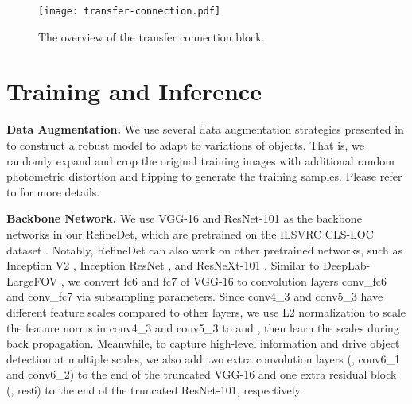 \documentclass[10pt,twocolumn,letterpaper]{article}
\begin{document}
\begin{figure}
\centering
\texttt{[image: transfer-connection.pdf]}
\vspace{-2mm}
\caption{The overview of the transfer connection block.}
\label{fig:transfer-connection-block}
\end{figure}


\section{Training and Inference}

{\noindent \textbf{Data Augmentation.}}
We use several data augmentation strategies presented in \cite{DBLP:conf/eccv/LiuAESRFB16} to construct a robust model to adapt to variations of objects. That is, we randomly expand and crop the original training images with additional random photometric distortion \cite{DBLP:journals/corr/Howard13} and flipping to generate the training samples. Please refer to \cite{DBLP:conf/eccv/LiuAESRFB16} for more details.

{\noindent \textbf{Backbone Network.}}
We use VGG-16 \cite{DBLP:journals/corr/SimonyanZ14a} and ResNet-101 \cite{DBLP:conf/cvpr/HeZRS16} as the backbone networks in our RefineDet, which are pretrained on the ILSVRC CLS-LOC dataset \cite{DBLP:journals/ijcv/RussakovskyDSKS15}. Notably, RefineDet can also work on other pretrained networks, such as Inception V2 \cite{DBLP:conf/icml/IoffeS15}, Inception ResNet \cite{DBLP:conf/aaai/SzegedyIVA17}, and ResNeXt-101 \cite{DBLP:journals/corr/XieGDTH16}. Similar to DeepLab-LargeFOV \cite{DBLP:conf/iclr/ChenPKMY14}, we convert fc6 and fc7 of VGG-16 to convolution layers conv\_fc6 and conv\_fc7 via subsampling parameters. Since conv4\_3 and conv5\_3 have different feature scales compared to other layers, we use L2 normalization \cite{DBLP:conf/iclrw/LiuRB15} to scale the feature norms in conv4\_3 and conv5\_3 to  and , then learn the scales during back propagation. Meanwhile, to capture high-level information and drive object detection at multiple scales, we also add two extra convolution layers (\ie, conv6\_1 and conv6\_2) to the end of the truncated VGG-16 and one extra residual block (\ie, res6) to the end of the truncated ResNet-101, respectively.
\end{document}

